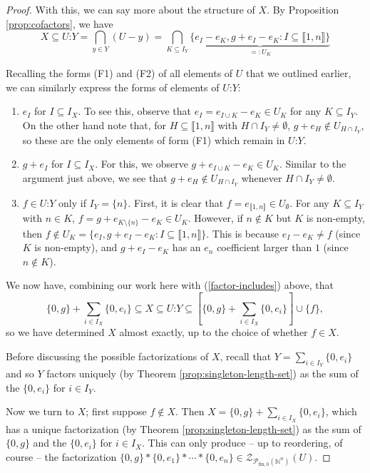 \documentclass{report}
\newcommand{\NN}{\mathbb{N}}
\renewcommand{\P}{\mathcal{P}}
\newcommand{\Z}{\mathcal{Z}}
\newcommand{\llb}{\llbracket}
\newcommand{\rrb}{\rrbracket}
\newcommand{\fon}{{\textrm{fin}, 0}}
\renewcommand{\:}{\text{:}}
\theoremstyle{definition}
\begin{document}
\begin{proof}
With this, we can say more about the structure of $X$.
By Proposition \ref{prop:cofactors}, we have 
\[X \subseteq U\:Y = \bigcap_{y\in Y}(U-y) = \bigcap_{K\subseteq I_Y} \underbrace{\{e_I - e_K, g+e_I - e_K : I\subseteq \llb 1,n \rrb \}}_{=:U_K} \]

Recalling the forms (F1) and (F2) of all elements of $U$ that we outlined earlier, we can similarly express the forms of elements of $U\:Y$:
\begin{enumerate}[(F1$'$)]
\item $e_I$ for $I\subseteq I_X$. 
To see this, observe that $e_I = e_{I\cup K}-e_K\in U_K$ for any $K\subseteq I_Y$.
On the other hand note that, for $H \subseteq \llb 1,n \rrb$ with $H\cap I_Y\neq \emptyset$, $g+e_H\notin U_{H\cap I_Y}$, so these are the only elements of form (F1) which remain in $U\:Y$.
%
\item $g+e_I$ for $I\subseteq I_X$.
For this, we observe $g+e_{I\cup K} - e_K\in U_K$. 
Similar to the argument just above, we see that $g+e_H\notin U_{H\cap I_Y}$ whenever $H\cap I_Y\neq\emptyset$.
\item $f\in U\:Y$ only if $I_Y = \{n\}$.
First, it is clear that $f = e_{\llb 1,n \rrb} \in U_\emptyset$.
For any $K\subseteq I_Y$ with $n\in K$, $f = g+ e_{K\setminus\{n\}} - e_K\in U_K$.
However, if $n\notin K$ but $K$ is non-empty, then $f\notin U_K = \{e_I, g+e_I-e_K: I\subseteq \llb1,n\rrb\}$.
This is because $e_I - e_K \neq f$ (since $K$ is non-empty), and $g+e_I-e_K$ has an $e_n$ coefficient larger than $1$ (since $n\notin K$).
\end{enumerate}
We now have, combining our work here with (\ref{factor-includes}) above, that
\[ \{0,g\} + \sum_{i\in I_X}\{0,e_i\} \subseteq X \subseteq U\:Y \subseteq \left[\{0,g\}+\sum_{i\in I_X} \{0,e_i\} \right]\cup\{f\},\]
so we have determined $X$ almost exactly, up to the choice of whether $f\in X$.

Before discussing the possible factorizations of $X$, recall that $Y = \sum_{i\in I_Y} \{0,e_i\}$ and so $Y$ factors uniquely (by Theorem \ref{prop:singleton-length-set}) as the sum of the $\{0,e_i\}$ for $i\in I_Y$.

Now we turn to $X$; first suppose $f\notin X$.
Then $X = \{0,g\} +\sum_{i\in I_X} \{0,e_i\}$, which has a unique factorization (by Theorem \ref{prop:singleton-length-set}) as the sum of $\{0,g\}$ and the $\{0,e_i\}$ for $i\in I_X$.
This can only produce -- up to reordering, of course -- the factorization $\{0,g\}*\{0,e_1\}*\cdots*\{0,e_n\}\in \Z_{\P_\fon(\NN^n)}(U)$.


\end{proof}
\end{document}
